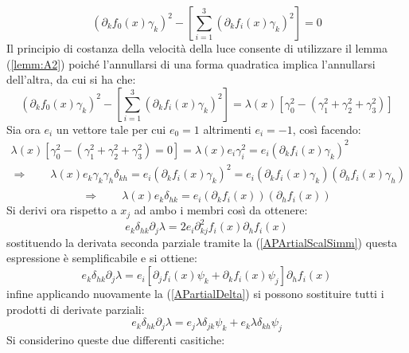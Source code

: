 \begin{equation*}
    \left(\partial_kf_0(x)\gamma_k\right)^2-\left[\sum_{i=1}^3\left(\partial_kf_i(x)\gamma_k\right)^2\right]=0
\end{equation*}
Il principio di costanza della velocità della luce consente di utilizzare il lemma (\ref{lemm:A2}) poiché l'annullarsi di una
 forma quadratica implica l'annullarsi dell'altra, da cui si ha che:
\begin{equation*}
    \left(\partial_kf_0(x)\gamma_k\right)^2-\left[\sum_{i=1}^3\left(\partial_kf_i(x)\gamma_k\right)^2\right]=
    \lambda(x)\left[\gamma_0^2-(\gamma_1^2+\gamma_2^2+\gamma_3^2)\right]
\end{equation*}
Sia ora $e_i$ un vettore tale per cui $e_0=1$ altrimenti $e_i=-1$, così facendo:
\begin{equation*}
    \begin{gathered}
        \lambda(x)\left[\gamma_0^2-(\gamma_1^2+\gamma_2^2+\gamma_3^2)=0\right]= \lambda(x)e_i\gamma_i^2
        =e_i\left(\partial_kf_i(x)\gamma_k\right)^2\\
        \Rightarrow \qquad \lambda(x)e_k\gamma_k\gamma_h\delta_{kh}=e_i(\partial_kf_i(x)\gamma_k)^2=e_i(\partial_kf_i(x)\gamma_k)(\partial_hf_i(x)\gamma_h)\\
    \end{gathered}
\end{equation*}
\begin{equation}
   \Rightarrow\qquad \lambda(x)e_k\delta_{hk}=e_i(\partial_kf_i(x))(\partial_hf_i(x))
    \label{APartialDelta}
\end{equation}
Si derivi ora rispetto a $x_j $ ad ambo i membri così da ottenere:
\begin{equation*}
    e_k \delta_{hk}\partial_j\lambda =2e_i\partial_{kj}^2f_i(x)\partial_hf_i(x)
\end{equation*}
sostituendo la derivata seconda parziale tramite la (\ref{APArtialScalSimm}) questa espressione è semplificabile e si ottiene:
\begin{equation}
    e_k\delta_{hk}\partial_j\lambda = e_i\left[\partial_jf_i(x)\psi_k+\partial_kf_i(x)\psi_j\right]\partial_hf_i(x)
\end{equation}    
infine applicando nuovamente la (\ref{APartialDelta}) si possono sostituire tutti i prodotti di derivate parziali:
\begin{equation*}
    e_k \delta_{hk}\partial_j\lambda=e_j\lambda\delta_{jk}\psi_k+e_k\lambda\delta_{kh}\psi_j
\end{equation*}
Si considerino queste due differenti casitiche:

